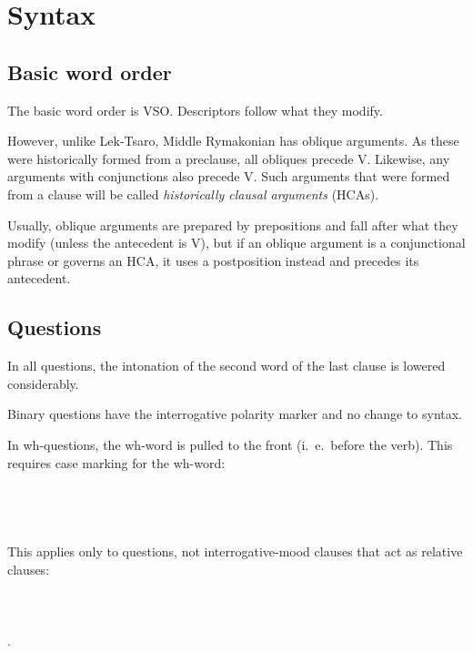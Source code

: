 \documentclass{book}
\newcommand{\lname}{Middle Rymakonian}
\begin{document}
\chapter{Syntax}

\section{Basic word order}

The basic word order is VSO. Descriptors follow what they modify.

However, unlike Lek-Tsaro, \lname{} has oblique arguments. As these were historically formed from a preclause, all obliques precede V. Likewise, any arguments with conjunctions also precede V. Such arguments that were formed from a clause will be called \emph{historically clausal arguments} (HCAs).

Usually, oblique arguments are prepared by prepositions and fall after what they modify (unless the antecedent is V), but if an oblique argument is a conjunctional phrase or governs an HCA, it uses a postposition instead and precedes its antecedent.

\section{Questions}

In all questions, the intonation of the second word of the last clause is lowered considerably.

Binary questions have the interrogative polarity marker and no change to syntax.

In wh-questions, the wh-word is pulled to the front (i.~e.~before the verb). This requires case marking for the wh-word: \\
~\\
 \\
   \\
    \\

This applies only to questions, not interrogative-mood clauses that act as relative clauses: \\
~\\
 \\
     \\
    .
\end{document}
